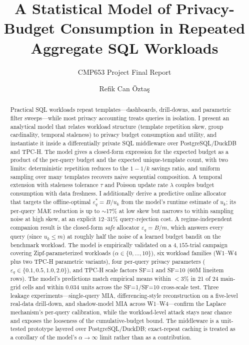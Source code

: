 \documentclass[sigconf,nonacm]{acmart}
\newcommand{\eps}{\varepsilon}
\begin{document}
\title{A Statistical Model of Privacy-Budget Consumption in Repeated Aggregate SQL Workloads}
\subtitle{CMP653 Project Final Report}

\author{Refik Can \"Ozta\c{s}}

\begin{abstract}
Practical SQL workloads repeat templates---dashboards, drill-downs, and parametric filter sweeps---while most privacy accounting treats queries in isolation. I present an analytical model that relates workload structure (template repetition skew, group cardinality, temporal staleness) to privacy budget consumption and utility, and instantiate it inside a differentially private SQL middleware over PostgreSQL/DuckDB and TPC-H. The model gives a closed-form expression for the expected budget as a product of the per-query budget and the expected unique-template count, with two limits: deterministic repetition reduces to the $1-1/k$ savings ratio, and uniform sampling over many templates recovers naive sequential composition. A temporal extension with staleness tolerance $\tau$ and Poisson update rate $\lambda$ couples budget consumption with data freshness. I additionally derive a predictive online allocator that targets the offline-optimal $\eps_q^* = B/u_k$ from the model's runtime estimate of $u_k$; its per-query MAE reduction is up to $\sim$17\% at low skew but narrows to within sampling noise at high skew, at an explicit $12$--$31\%$ query-rejection cost. A regime-independent companion result is the closed-form \emph{safe} allocator $\eps_q=B/m$, which answers every query (since $u_k\le m$) at roughly half the noise of a learned budget bandit on the benchmark workload. The model is empirically validated on a $4{,}155$-trial campaign covering Zipf-parameterized workloads ($\alpha \in \{0,\ldots,10\}$), six workload families (W1--W4 plus two TPC-H parametric variants), four per-query privacy parameters ($\eps_q \in \{0.1, 0.5, 1.0, 2.0\}$), and TPC-H scale factors SF=1 and SF=10 (60M lineitem rows). The model's predictions match empirical means within $<3\%$ in 21 of 24 main-grid cells and within $0.034$ units across the SF=1/SF=10 cross-scale test. Three leakage experiments---single-query MIA, differencing-style reconstruction on a five-level real-data drill-down, and shadow-model MIA across W1--W4---confirm the Laplace mechanism's per-query calibration, while the workload-level attack stays near chance and exposes the looseness of the cumulative-budget bound. The middleware is a unit-tested prototype layered over PostgreSQL/DuckDB; exact-repeat caching is treated as a corollary of the model's $\alpha\to\infty$ limit rather than as a contribution.
\end{abstract}
\end{document}
